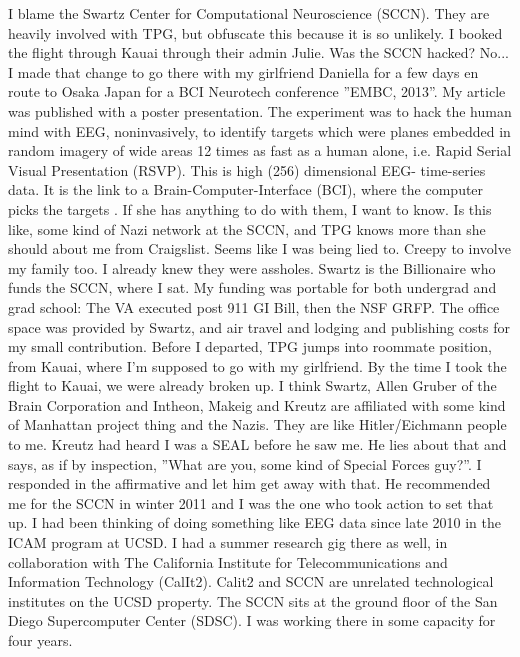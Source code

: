 \documentclass{article}
\begin{document}
\begin{multicols}{2}
I blame the Swartz Center for Computational Neuroscience (SCCN). They are heavily involved with TPG, but obfuscate this because it is so unlikely. I booked the flight through Kauai through their admin Julie. Was the SCCN hacked? No... I made that change to go there with my girlfriend Daniella for a few days en route to Osaka Japan for a BCI Neurotech conference ''EMBC, 2013''. My article was published with a poster presentation. The experiment was to hack the human mind with EEG, noninvasively, to identify targets which were planes embedded in random imagery of wide areas 12 times as fast as a human alone, i.e. Rapid Serial Visual Presentation (RSVP). This is high (256) dimensional EEG- time-series data. It is the link to a Brain-Computer-Interface (BCI), where the computer picks the targets \cite{rerp}. If she has anything to do with them, I want to know. Is this like, some kind of Nazi network at the SCCN, and TPG knows more than she should about me from Craigslist. Seems like I was being lied to. Creepy to involve my family too. I already knew they were assholes. Swartz is the Billionaire who funds the SCCN, where I sat. My funding was portable for both undergrad and grad school: The VA executed post 911 GI Bill, then the NSF GRFP. The office space was provided by Swartz, and air travel and lodging and publishing costs for my small contribution. Before I departed, TPG jumps into roommate position, from Kauai, where I'm supposed to go with my girlfriend. By the time I took the flight to Kauai, we were already broken up. I think Swartz, Allen Gruber of the Brain Corporation and Intheon, Makeig and Kreutz are affiliated with some kind of Manhattan project thing and the Nazis. They are like Hitler/Eichmann people to me. Kreutz had heard I was a SEAL before he saw me. He lies about that and says, as if by inspection, ''What are you, some kind of Special Forces guy?''. I responded in the affirmative and let him get away with that. He recommended me for the SCCN in winter 2011 and I was the one who took action to set that up. I had been thinking of doing something like EEG data since late 2010 in the ICAM program at UCSD. I had a summer research gig there as well, in collaboration with The California Institute for Telecommunications and Information Technology (CalIt2). Calit2 and SCCN are unrelated technological institutes on the UCSD property. The SCCN sits at the ground floor of the San Diego Supercomputer Center (SDSC). I was working there in some capacity for four years. 


\end{multicols}
\end{document}
